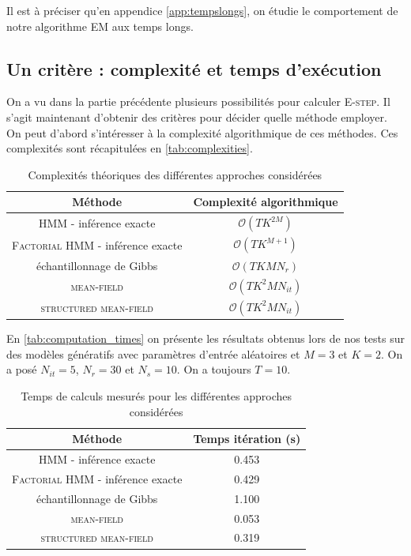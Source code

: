 \documentclass[10pt,a4paper]{article}
\newcommand{\hmm}{\textsc{HMM}}
\newcommand{\fhmm}{\textsc{Factorial HMM}}
\newcommand{\Estep}{\textsc{E-step}}
\newcommand{\EM}{\textsc{EM}}
\newcommand{\meanfield}{\textsc{mean-field}}
\newcommand{\structmeanfield}{\textsc{structured mean-field}}
\begin{document}
Il est à préciser qu'en appendice \ref{app:tempslongs}, on étudie le comportement de notre algorithme \EM{} aux temps longs.

\subsection{Un critère : complexité et temps d'exécution}

On a vu dans la partie précédente plusieurs possibilités pour calculer \Estep.
Il s'agit maintenant d'obtenir des critères pour décider quelle méthode
employer.
On peut d'abord s'intéresser à la complexité algorithmique de ces méthodes.
Ces complexités sont récapitulées en \autoref{tab:complexities}.

\begin{table}[hpbt]
\begin{center}
\begin{tabular}{|c|c|}
\hline
Méthode & Complexité algorithmique \\
\hline \hline
\hmm{} - inférence exacte &  $\mathcal{O}(TK^{2M})$ \\ \hline
\fhmm{} - inférence exacte &  $\mathcal{O}(TK^{M+1})$ \\ \hline
échantillonnage de Gibbs &  $\mathcal{O}(TKM N_r )$ \\ \hline
\meanfield{} & $\mathcal{O}(TK^2MN_{it})$ \\ \hline
\structmeanfield{} & $\mathcal{O}(TK^2MN_{it})$ \\ \hline
\end{tabular}
\end{center}
\caption{Complexités théoriques des différentes approches considérées\label{tab:complexities}}
\end{table}

En \autoref{tab:computation_times} on présente les résultats obtenus lors de
nos tests sur des modèles génératifs avec paramètres d'entrée aléatoires et
$M=3$ et $K=2$.
On a posé $N_{it}=5$, $N_r=30$ et $N_s=10$. On a toujours $T=10$.

\begin{table}[hpbt] 
\begin{center}
\begin{tabular}{|c|c|}
\hline
Méthode & Temps itération (s) \\
\hline \hline
\hmm{} - inférence exacte & 0.453  \\ \hline
\fhmm{} - inférence exacte & 0.429 \\ \hline
échantillonnage de Gibbs &  1.100 \\ \hline
\meanfield{} & 0.053 \\ \hline
\structmeanfield{} & 0.319 \\ \hline
\end{tabular}
\end{center}
\caption{Temps de calculs mesurés pour les différentes approches considérées
\label{tab:computation_times}}
\end{table}
\end{document}
